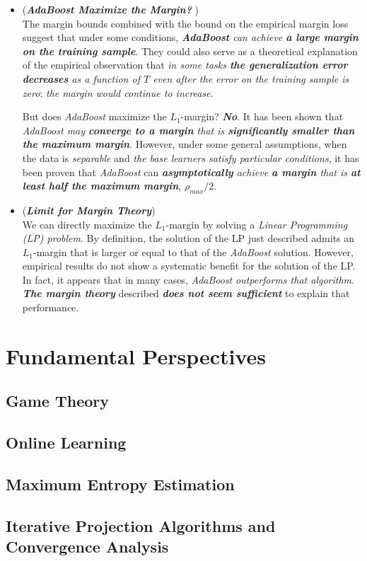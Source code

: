 \documentclass[11pt]{article}
\begin{document}
\begin{itemize}
\item \begin{remark} (\emph{\textbf{AdaBoost Maximize the Margin? }})\\
The margin bounds combined with the bound on the empirical margin loss suggest that under some conditions, \emph{\textbf{AdaBoost} can achieve \textbf{a large margin on the training sample}}. They could also serve as a theoretical explanation of the empirical observation that \emph{in some tasks \textbf{the generalization error decreases} as a function of $T$ even after the error on the training sample is zero}: \emph{the margin would continue to increase}. 

But does \emph{AdaBoost} maximize the $L_1$-margin? \emph{\textbf{No}}. It has been shown that \emph{AdaBoost may \textbf{converge to a margin} that is \textbf{significantly smaller than the maximum margin}}. However, under some general assumptions, when the data is \emph{separable} and \emph{the base learners satisfy particular conditions}, it has been proven that \emph{AdaBoost} can \emph{\textbf{asymptotically} achieve \textbf{a margin} that is \textbf{at least half the maximum margin}}, $\rho_{max}/2$.
\end{remark}

\item \begin{remark} (\emph{\textbf{Limit for Margin Theory}})\\
We can directly maximize the $L_1$-margin by solving a \emph{Linear Programming (LP) problem}. By definition, the solution of the LP just described admits an $L_1$-margin that is larger or equal to that of the \emph{AdaBoost} solution. However, empirical results do not show a systematic benefit for the solution of the LP. In fact, it appears that in many cases, \emph{AdaBoost} \emph{outperforms that algorithm}.  \emph{\textbf{The margin theory}} described \emph{\textbf{does not seem sufficient}} to explain that performance.
\end{remark}
\end{itemize}
\section{Fundamental Perspectives}
\subsection{Game Theory}
\subsection{Online Learning}
\subsection{Maximum Entropy Estimation}
\subsection{Iterative Projection Algorithms and Convergence Analysis}


\newpage


\end{document}
